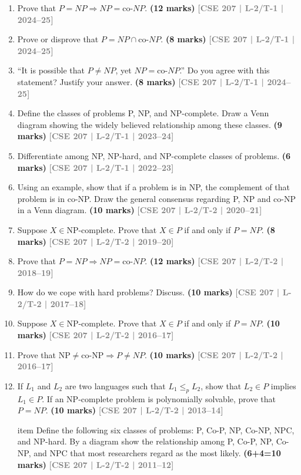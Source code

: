 \documentclass[12pt,a3paper]{article}
\newcommand{\yr}[1]{\hfill\textcolor{gray}{\small\textbf{[#1]}}}
\newcommand{\mk}[1]{\textcolor{orange!70!black}{\small\textbf{(#1 marks)}}}
\begin{document}
\begin{enumerate}

\item Prove that $P = NP \Rightarrow NP = \text{co-}NP$.
\mk{12} \yr{CSE 207 | L-2/T-1 | 2024--25}

\item Prove or disprove that $P = NP \cap \text{co-}NP$.
\mk{8} \yr{CSE 207 | L-2/T-1 | 2024--25}

\item ``It is possible that $P \neq NP$, yet $NP = \text{co-}NP$.'' Do you agree with this statement? Justify your answer.
\mk{8} \yr{CSE 207 | L-2/T-1 | 2024--25}

\item Define the classes of problems P, NP, and NP-complete. Draw a Venn diagram showing the widely believed relationship among these classes.
\mk{9} \yr{CSE 207 | L-2/T-1 | 2023--24}

\item Differentiate among NP, NP-hard, and NP-complete classes of problems.
\mk{6} \yr{CSE 207 | L-2/T-1 | 2022--23}

\item Using an example, show that if a problem is in NP, the complement of that problem is in co-NP. Draw the general consensus regarding P, NP and co-NP in a Venn diagram.
\mk{10} \yr{CSE 207 | L-2/T-2 | 2020--21}

\item Suppose $X \in \text{NP-complete}$. Prove that $X \in P$ if and only if $P = NP$.
\mk{8} \yr{CSE 207 | L-2/T-2 | 2019--20}

\item Prove that $P = NP \Rightarrow NP = \text{co-}NP$.
\mk{12} \yr{CSE 207 | L-2/T-2 | 2018--19}

\item How do we cope with hard problems? Discuss. \mk{10}
\yr{CSE 207 | L-2/T-2 | 2017--18}

\item Suppose $X \in \text{NP-complete}$. Prove that $X \in P$ if and only if $P = NP$. \mk{10}
\yr{CSE 207 | L-2/T-2 | 2016--17}

\item Prove that $\text{NP} \neq \text{co-NP} \Rightarrow P \neq NP$. \mk{10}
\yr{CSE 207 | L-2/T-2 | 2016--17}

\item If $L_1$ and $L_2$ are two languages such that $L_1 \leq_p L_2$, show that $L_2 \in P$ implies $L_1 \in P$. If an NP-complete problem is polynomially solvable, prove that $P = NP$. \mk{10}
\yr{CSE 207 | L-2/T-2 | 2013--14}

item Define the following six classes of problems: P, Co-P, NP, Co-NP, NPC, and NP-hard. By a diagram show the relationship among P, Co-P, NP, Co-NP, and NPC that most researchers regard as the most likely. \mk{6+4=10}
\yr{CSE 207 | L-2/T-2 | 2011--12}


\end{enumerate}
\end{document}
